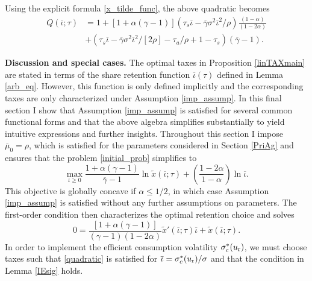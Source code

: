 \documentclass[11pt]{article}
\theoremstyle{plain}
\begin{document}
Using the explicit formula \eqref{x_tilde_func},
the above quadratic becomes
\begin{align*}
Q(\overline{\iota};\tau) & = 1 + [1 + \alpha(\gamma-1)]{\left(\tau_s \overline{\iota}  - \overline{\gamma}\sigma^2\overline{\iota}^2/\rho\right)}\frac{(1-\alpha)}{(1 - 2\alpha)}
\\ & + {\left(\tau_s\overline{\iota} - \overline{\gamma}\sigma^2\overline{\iota}^2/[2\rho] - \tau_a/\rho + 1 - \tau_s\right)}(\overline{\gamma}-1).
\end{align*}

\fi

\textbf{Discussion and special cases.} The optimal taxes in Proposition \ref{linTAXmain} are stated in terms of the share retention function $\overline{\iota}(\tau)$ defined in Lemma \ref{arb_eq}. However, this function is only defined implicitly and the corresponding taxes are only characterized under Assumption \ref{imp_assump}. In this final section I show that Assumption \ref{imp_assump} is satisfied for several common functional forms and that the above algebra simplifies substantially to yield intuitive expressions and further insights. Throughout this section I impose $\overline{\mu}_0 = \rho$, which is satisfied for the parameters considered in Section \ref{PriAg} and ensures that the problem \eqref{initial_prob} simplifies to 
\begin{equation} %
\max_{\overline{\iota} \geq 0} \frac{1 + \alpha(\gamma-1)}{\overline{\gamma}-1}\ln \tilde{x}(\overline{\iota};\tau) + {\left(\frac{1 - 2\alpha}{1 - \alpha}\right)} \ln \overline{\iota}.
\label{initial_prob_simp}
\end{equation}
This objective is globally concave if $\alpha \leq 1/2$, in which case Assumption \ref{imp_assump} is satisfied without any further assumptions on parameters. The first-order condition then characterizes the optimal retention choice and solves %
\begin{equation}
0 = \frac{[1 + \alpha(\gamma-1)]}{(\gamma-1)(1 - 2\alpha)}\tilde{x}'(\overline{\iota};\tau)\overline{\iota} + \tilde{x}(\overline{\iota};\tau).
\label{quadratic}
\end{equation}
In order to implement the efficient consumption volatility $\sigma_c^*(u_{\textnormal{r}})$, we must choose taxes such that \eqref{quadratic} is satisfied for $\overline{\iota} = \sigma_c^*(u_{\textnormal{r}})/\sigma$ and that the condition in Lemma \ref{IEsig} holds. 
\end{document}
